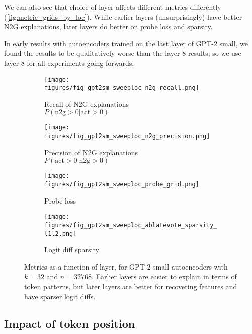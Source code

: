 We can also see that choice of layer affects different metrics differently (\autoref{fig:metric_grids_by_loc}).  While earlier layers (unsurprisingly) have better N2G explanations, later layers do better on probe loss and sparsity.


In early results with autoencoders trained on the last layer of GPT-2 small, we found the results to be qualitatively worse than the layer 8 results, so we use layer 8 for all experiments going forwards.

\begin{figure*}[t!]
    \begin{subfigure}[b]{0.5\textwidth}
        \centering
        \texttt{[image: figures/fig\_gpt2sm\_sweeploc\_n2g\_recall.png]}
        \caption{Recall of N2G explanations\\$P(\text{n2g}>0 | \text{act}>0)$}
        \label{fig:metric_grids_n2g_recall_by_loc}
    \end{subfigure}
    \begin{subfigure}[b]{0.5\textwidth}
        \centering
        \texttt{[image: figures/fig\_gpt2sm\_sweeploc\_n2g\_precision.png]}
        \caption{Precision of N2G explanations\\$P(\text{act}>0 | \text{n2g}>0)$}
        \label{fig:metric_grids_n2g_precision_by_loc}
    \end{subfigure}


    \begin{subfigure}[b]{0.5\textwidth}
        \centering
        \texttt{[image: figures/fig\_gpt2sm\_sweeploc\_probe\_grid.png]}
        \caption{Probe loss}
        \label{fig:metric_grids_probe_by_loc}
    \end{subfigure}%
    \begin{subfigure}[b]{0.5\textwidth}
        \centering
        \texttt{[image: figures/fig\_gpt2sm\_sweeploc\_ablatevote\_sparsity\_l1l2.png]}
        \caption{Logit diff sparsity}
        \label{fig:metric_grids_sparsity_by_loc}
    \end{subfigure}
    \caption{Metrics as a function of layer, for GPT-2 small autoencoders with $k=32$ and $n=32768$.  Earlier layers are easier to explain in terms of token patterns, but later layers are better for recovering features and have sparser logit diffs.
    }
    \label{fig:metric_grids_by_loc}


\end{figure*}



\subsection{Impact of token position}
\label{sec:token_position}

